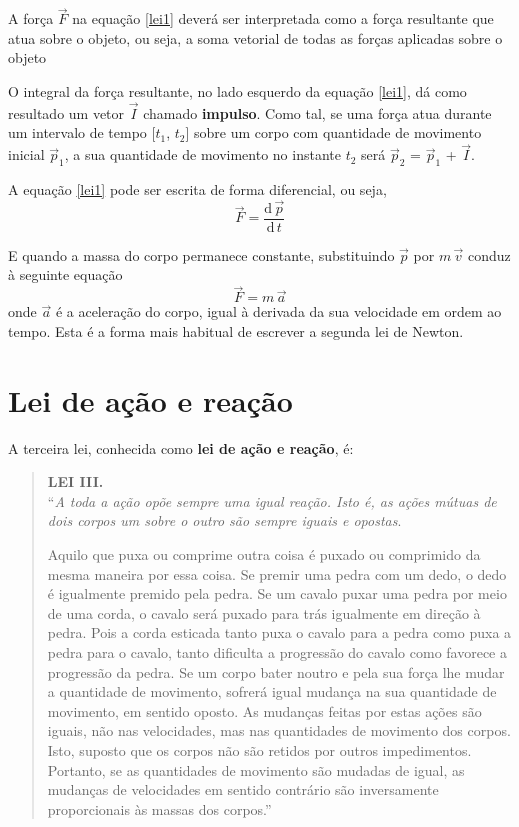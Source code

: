 \documentclass[a4paper,12pt]{article}
\begin{document}
A força $\vec{F}$ na equação \ref{lei1} deverá ser interpretada como
a força resultante que atua sobre o objeto, ou seja, a soma vetorial
de todas as forças aplicadas sobre o objeto

O integral da força resultante, no lado esquerdo da equação
\ref{lei1}, dá como resultado um vetor $\vec{I}$ chamado
\textbf{impulso}. Como tal, se uma força atua durante um intervalo de
tempo [$t _{1}$, $t _{2}$] sobre um corpo com quantidade de movimento
inicial $\vec{p}_1$, a sua quantidade de movimento no instante
$t _{2}$ será $\vec{p} _{2}$ = $\vec{p} _{1}$ + $\vec{I}$.

A equação \ref{lei1} pode ser escrita de forma diferencial, ou seja,
\begin{equation}
\vec{F} = \frac{\mathrm{d}\,\vec{p}}{\mathrm{d}\,t}
\end{equation}

E quando a massa do corpo permanece constante, substituindo $\vec{p}$ por
$m\,\vec{v}$ conduz à seguinte equação
\begin{equation}
\vec{F} = m\,\vec{a}
\end{equation}
onde $\vec{a}$ é a aceleração do corpo, igual à derivada da sua
velocidade em ordem ao tempo. Esta é a forma mais habitual de escrever
a segunda lei de Newton.

\section{Lei de ação e reação}

A terceira lei, conhecida como \textbf{lei de ação e reação}, é:

\begin{quotation}
\noindent\textbf{LEI III.}\\
``\emph{A toda a ação opõe sempre uma igual
reação.  Isto é, as ações mútuas de dois
corpos um sobre o outro são sempre iguais e opostas}.

Aquilo que puxa ou comprime outra coisa é puxado ou comprimido da mesma
maneira por essa coisa. Se premir uma pedra com um dedo, o dedo é
igualmente premido pela pedra. Se um cavalo puxar uma pedra por meio de uma
corda, o cavalo será puxado para trás igualmente em direção à pedra.
Pois a corda esticada tanto puxa o cavalo para a pedra como puxa a pedra
para o cavalo, tanto dificulta a progressão do cavalo como favorece a
progressão da pedra. Se um corpo bater noutro e pela sua força lhe mudar
a quantidade de movimento, sofrerá igual mudança na sua quantidade de
movimento, em sentido oposto. As mudanças feitas por estas ações são
iguais, não nas velocidades, mas nas quantidades de movimento dos corpos.
Isto, suposto que os corpos não são retidos por outros impedimentos.
Portanto, se as quantidades de movimento são mudadas de igual, as
mudanças de velocidades em sentido contrário são inversamente
proporcionais às massas dos corpos.''
\end{quotation}
\end{document}
